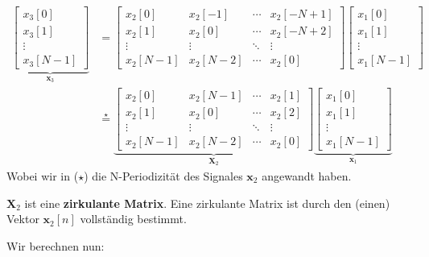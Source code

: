 \documentclass[11pt]{article}
\begin{document}
\begin{align*}
    \underbrace{\begin{bmatrix}
        x_3[0] \\
        x_3[1] \\
        \vdots \\
        x_3[N-1]
    \end{bmatrix}}_{\mathbf{x}_3} &= \begin{bmatrix}
        x_2[0] & x_2[-1] & \cdots & x_2[-N+1] \\
        x_2[1] & x_2[0] & \cdots & x_2[-N+2] \\
        \vdots & \vdots & \ddots & \vdots \\
        x_2[N-1] & x_2[N-2] & \cdots & x_2[0]
    \end{bmatrix} \begin{bmatrix}
        x_1[0] \\
        x_1[1] \\
        \vdots \\
        x_1[N-1]
    \end{bmatrix} \\
    &\overset{\star}{=} \underbrace{\begin{bmatrix}
        x_2[0] & x_2[N-1] & \cdots & x_2[1] \\
        x_2[1] & x_2[0] & \cdots & x_2[2] \\
        \vdots & \vdots & \ddots & \vdots \\
        x_2[N-1] & x_2[N-2] & \cdots & x_2[0]
    \end{bmatrix}}_{\mathbf{X}_2} \underbrace{\begin{bmatrix}
        x_1[0] \\
        x_1[1] \\
        \vdots \\
        x_1[N-1]
    \end{bmatrix}}_{\mathbf{x}_1}
\end{align*}
Wobei wir in ($\star$) die N-Periodizität des Signales $\mathbf{x}_2$ angewandt haben.

$\mathbf{X}_2$ ist eine \textbf{zirkulante Matrix}. Eine zirkulante Matrix ist durch den (einen) Vektor $\mathbf{x}_2[n]$ vollständig bestimmt.

Wir berechnen nun:
\end{document}

